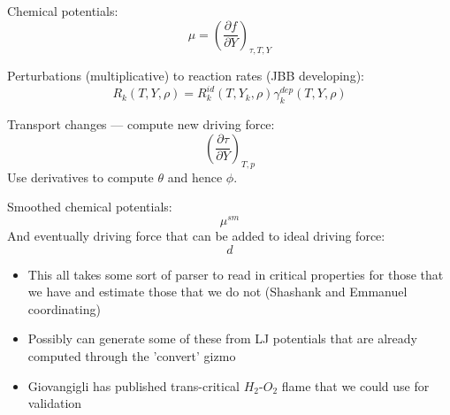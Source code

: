 \documentclass[11pt]{article}
\begin{document}
Chemical potentials:
\[
\mu = \left(\frac{\partial f}{\partial Y}\right)_{\tau,T,Y}
\]

Perturbations (multiplicative) to reaction rates (JBB developing):
\begin{equation}
\label{eq:rxn_corr}
R_k(T,Y,\rho) = R_k^{id}(T,Y_k,\rho)\gamma_k^{dep}(T,Y,\rho)
\end{equation}

Transport changes --- compute new driving force:
\[
\left(\frac{\partial \tau}{\partial Y}\right)_{T,p}
\]
Use derivatives to compute $\theta$ and hence $\phi$.

Smoothed chemical potentials:
\[
\mu^{sm}
\]
And eventually driving force that can be added to ideal driving force:
\[
d
\]

\begin{itemize}
    \item This all takes some sort of parser to read in critical properties for those that we have and estimate those that we do not (Shashank and Emmanuel coordinating)
    \item Possibly can generate some of these from LJ potentials that are already computed through the 'convert' gizmo
    \item Giovangigli has published trans-critical $H_2$-$O_2$ flame that we could use for validation 
    \
\end{itemize}
\end{document}
